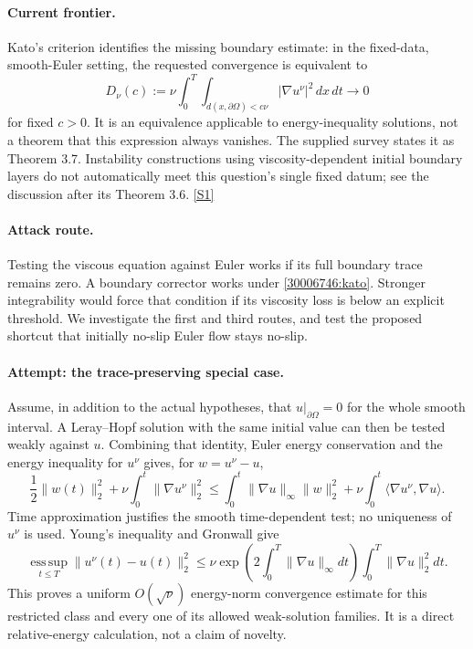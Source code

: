 \documentclass[11pt,a4paper]{article}
\newcommand{\sref}[2]{\hyperlink{source:#1:#2}{[S#2]}}
\numberwithin{equation}{section}
\begin{document}
\paragraph{Current frontier.}
Kato's criterion identifies the missing boundary estimate: in the fixed-data,
smooth-Euler setting, the requested convergence is equivalent to
\begin{equation}\label{30006746:kato}
 D_\nu(c):=\nu\int_0^T\int_{d(x,\partial\Omega)<c\nu}
                       |\nabla u^\nu|^2\,dx\,dt\longrightarrow0
\end{equation}
for fixed $c>0$. It is an equivalence applicable to energy-inequality
solutions, not a theorem that this expression always vanishes. The supplied
survey states it as Theorem 3.7. Instability constructions using
viscosity-dependent initial boundary layers do not automatically meet this
question's single fixed datum; see the discussion after its Theorem 3.6.
\sref{30006746}{1}

\paragraph{Attack route.}
Testing the viscous equation against Euler works if its full boundary trace
remains zero. A boundary corrector works under \eqref{30006746:kato}. Stronger
integrability would force that condition if its viscosity loss is below an
explicit threshold. We investigate the first and third routes, and test the
proposed shortcut that initially no-slip Euler flow stays no-slip.

\paragraph{Attempt: the trace-preserving special case.}
Assume, in addition to the actual hypotheses, that
$u|_{\partial\Omega}=0$ for the whole smooth interval. A Leray--Hopf solution
with the same initial value can then be tested weakly against $u$.
Combining that identity, Euler energy conservation and the energy inequality
for $u^\nu$ gives, for $w=u^\nu-u$,
\[
 \frac12\|w(t)\|_2^2+\nu\int_0^t\|\nabla u^\nu\|_2^2
 \le\int_0^t\|\nabla u\|_\infty\|w\|_2^2
   +\nu\int_0^t\langle\nabla u^\nu,\nabla u\rangle.
\]
Time approximation justifies the smooth time-dependent test; no uniqueness
of $u^\nu$ is used. Young's inequality and Gronwall give
\begin{equation}\label{30006746:trace}
 \operatorname*{ess\,sup}_{t\le T}\|u^\nu(t)-u(t)\|_2^2
 \le\nu\exp\!\left(2\int_0^T\|\nabla u\|_\infty dt\right)
                  \int_0^T\|\nabla u\|_2^2dt.
\end{equation}
This proves a uniform $O(\sqrt\nu)$ energy-norm convergence estimate for
this restricted class and every one of its allowed weak-solution families.
It is a direct relative-energy calculation, not a claim of novelty.
\end{document}
